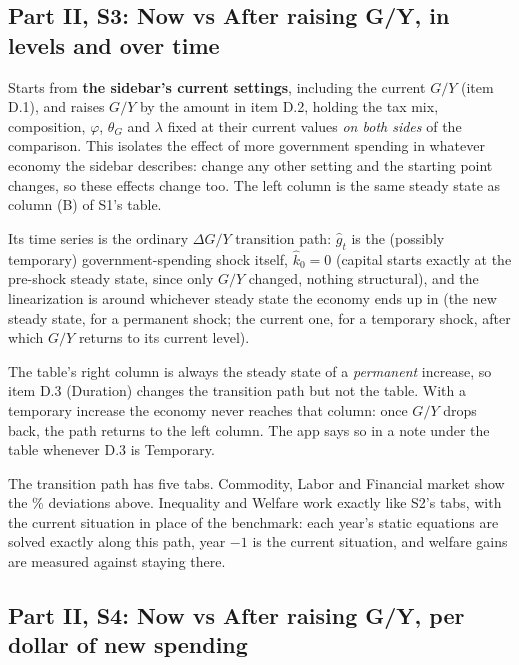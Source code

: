 \documentclass[11pt]{article}
\begin{document}
\subsection{Part II, S3: Now vs After raising G/Y, in levels and over time}

Starts from \textbf{the sidebar's current settings}, including the current
$G/Y$ (item D.1), and raises $G/Y$ by the amount in item D.2, holding the
tax mix, composition, $\varphi$, $\theta_G$ and $\lambda$ fixed at their
current values \emph{on both sides} of the comparison. This isolates the
effect of more government spending in whatever economy the sidebar
describes: change any other setting and the starting point changes, so
these effects change too. The left column is the same steady state as
column (B) of S1's table.

Its time series is the ordinary $\Delta G/Y$ transition path: $\hat g_t$ is
the (possibly temporary) government-spending shock itself, $\hat k_0=0$
(capital starts exactly at the pre-shock steady state, since only $G/Y$
changed, nothing structural), and the linearization is around whichever
steady state the economy ends up in (the new steady state, for a permanent
shock; the current one, for a temporary shock, after which $G/Y$ returns
to its current level).

The table's right column is always the steady state of a \emph{permanent}
increase, so item D.3 (Duration) changes the transition path but not the
table. With a temporary increase the economy never reaches that column:
once $G/Y$ drops back, the path returns to the left column. The app says
so in a note under the table whenever D.3 is Temporary.

The transition path has five tabs. Commodity, Labor and Financial market
show the \% deviations above. Inequality and Welfare work exactly like
S2's tabs, with the current situation in place of the benchmark: each
year's static equations are solved exactly along this path, year $-1$ is
the current situation, and welfare gains are measured against staying
there.

\subsection{Part II, S4: Now vs After raising G/Y, per dollar of new spending}
\end{document}
